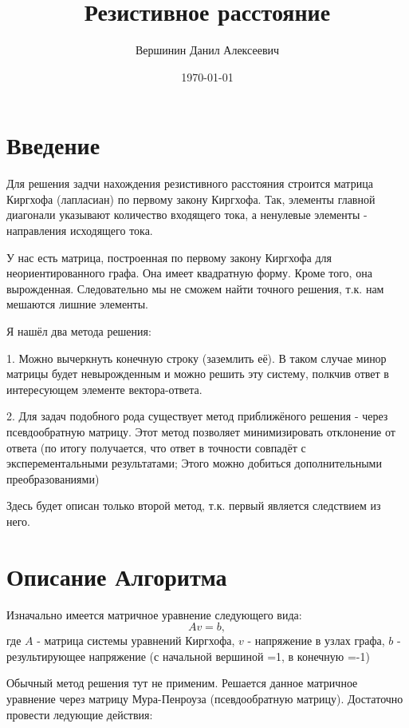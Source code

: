 \documentclass{article}
\title{\vspace{-1cm}Резистивное расстояние}
\author{Вершинин Данил Алексеевич}
\date{\today}
\begin{document}
	
	\maketitle
	\section{Введение}
	 Для решения задчи нахождения резистивного расстояния строится матрица Киргхофа (лапласиан) по первому закону Киргхофа. Так, элементы главной диагонали указывают количество входящего тока, а ненулевые элементы - направления исходящего тока.
	 
	 
	 У нас есть матрица, построенная по первому закону Киргхофа для неориентированного графа. Она имеет квадратную форму. Кроме того, она вырожденная. Следовательно мы не сможем найти точного решения, т.к. нам мешаются лишние элементы. 
	 
	 
	 Я нашёл два метода решения:
	 
	 1.    Можно вычеркнуть конечную строку (заземлить её). В таком случае минор 
	 матрицы будет невырожденным и можно решить эту систему, полкчив ответ в интересующем элементе вектора-ответа.
	 
	 
	 2.   Для задач подобного рода существует метод приближёного решения - через псевдообратную матрицу. Этот метод позволяет минимизировать отклонение от ответа (по итогу получается, что ответ в точности совпадёт с эксперементальными результатами; Этого можно добиться дополнительными преобразованиями)
	 
	 
	 Здесь будет описан только второй метод, т.к. первый является следствием из него.
	 
	 
	 \section{Описание Алгоритма\cite{RD}}
	 
	 
	 Изначально имеется матричное уравнение следующего вида:
	 $$Av=b,$$
	  где $A$ - матрица системы уравнений Киргхофа, $v$ - напряжение в узлах графа, $b$ - результирующее напряжение (с начальной вершиной =1, в конечную =-1)
	 
	 Обычный метод решения тут не применим. Решается данное матричное уравнение через матрицу Мура-Пенроуза (псевдообратную матрицу). Достаточно провести ледующие действия:
	 
\end{document}

